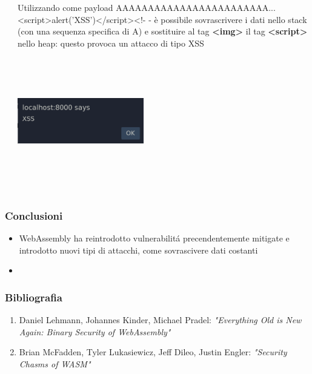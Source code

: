 \documentclass{beamer}
\begin{document}
\begin{frame}
\begin{columns}
\begin{column}{0.5\textwidth}
    \end{column}
    \begin{column}{0.5\textwidth}
      Utilizzando come payload
      \newline\newline\newline
      AAAAAAAAAAAAAAAAAAAAAAAA...
      <script>alert('XSS')</script><!- -
      \newline\newline\newline
      è possibile sovrascrivere i dati nello stack (con una sequenza specifica di A) e sostituire al tag
      \textbf{<img>} il tag \textbf{<script>} nello heap: questo provoca un attacco di
      tipo XSS
      \newline\newline\newline
      \centerline{\includegraphics[width=5.5cm,height=5.5cm,keepaspectratio]{images/xss.png}}
    \end{column}

  \end{columns}
\end{frame}


\begin{frame}
  \frametitle{Conclusioni}
  \begin{itemize}
    \item WebAssembly ha reintrodotto vulnerabilitá precendentemente mitigate
      e introdotto nuovi tipi di attacchi, come sovrascivere dati costanti
    \item  
  \end{itemize}
\end{frame}

\begin{frame}
  \frametitle{Bibliografia}
  \begin{enumerate}
    \item Daniel Lehmann, Johannes Kinder, Michael Pradel: \emph{"Everything Old is New Again:
      Binary Security of WebAssembly"}
    \item Brian McFadden, Tyler Lukasiewicz, Jeff Dileo, Justin Engler:
      \emph{"Security Chasms of WASM"}
  \end{enumerate}
\end{frame}
\end{document}

